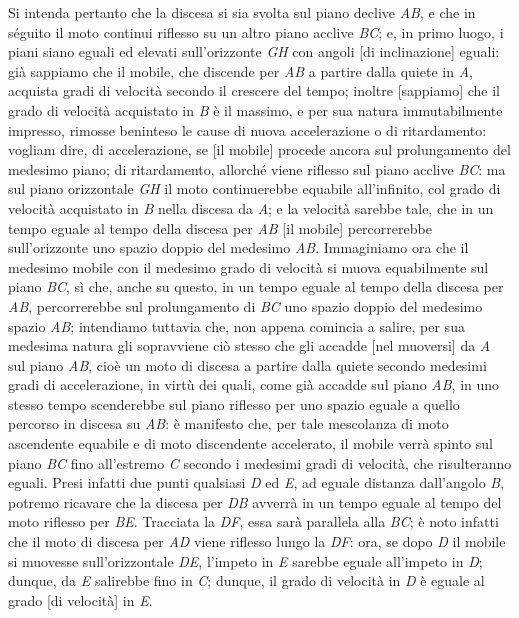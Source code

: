 \documentclass[11pt,twoside,openany]{book}
\begin{document}
Si intenda pertanto che la discesa si sia svolta sul piano declive \emph{AB}, e che in séguito il moto continui riflesso su un altro piano acclive \emph{BC}; e, in primo luogo, i piani siano eguali ed elevati sull'orizzonte \emph{GH} con angoli [di inclinazione] eguali: già sappiamo che il mobile, che discende per \emph{AB} a partire dalla quiete in \emph{A}, acquista gradi di velocità secondo il crescere del tempo; inoltre [sappiamo] che il grado di velocità acquistato in \emph{B} è il massimo, e per sua natura immutabilmente impresso, rimosse beninteso le cause di nuova accelerazione o di ritardamento: vogliam dire, di accelerazione, se [il mobile] procede ancora sul prolungamento del medesimo piano; di ritardamento, allorché viene riflesso sul piano acclive \emph{BC}: ma sul piano orizzontale \emph{GH} il moto continuerebbe equabile all'infinito, col grado di velocità acquistato in \emph{B} nella discesa da \emph{A}; e la velocità sarebbe tale, che in un tempo eguale al tempo della discesa per \emph{AB} [il mobile] percorrerebbe sull'orizzonte uno spazio doppio del medesimo \emph{AB}. Immaginiamo ora che il medesimo mobile con il medesimo grado di velocità si muova equabilmente sul piano \emph{BC}, sì che, anche su questo, in un tempo eguale al tempo della discesa per \emph{AB}, percorrerebbe sul prolungamento di \emph{BC} uno spazio doppio del medesimo spazio \emph{AB}; intendiamo tuttavia che, non appena comincia a salire, per sua medesima natura gli sopravviene ciò stesso che gli accadde [nel muoversi] da \emph{A} sul piano \emph{AB}, cioè un moto di discesa a partire dalla quiete secondo medesimi gradi di accelerazione, in virtù dei quali, come già accadde sul piano \emph{AB}, in uno stesso tempo scenderebbe sul piano riflesso per uno spazio eguale a quello percorso in discesa su \emph{AB}: è manifesto che, per tale mescolanza di moto ascendente equabile e di moto discendente accelerato, il mobile verrà spinto sul piano \emph{BC} fino all'estremo \emph{C} secondo i medesimi gradi di velocità, che risulteranno eguali. Presi infatti due punti qualsiasi \emph{D} ed \emph{E}, ad eguale distanza dall'angolo \emph{B}, potremo ricavare che la discesa per \emph{DB} avverrà in un tempo eguale al tempo del moto riflesso per \emph{BE}. Tracciata la \emph{DF}, essa sarà parallela alla \emph{BC}; è noto infatti che il moto di discesa per \emph{AD} viene riflesso lungo la \emph{DF}: ora, se dopo \emph{D} il mobile si muovesse sull'orizzontale \emph{DE}, l'impeto in \emph{E} sarebbe eguale all'impeto in \emph{D}; dunque, da \emph{E} salirebbe fino in \emph{C}; dunque, il grado di velocità in \emph{D} è eguale al grado [di velocità] in \emph{E}.
\end{document}
